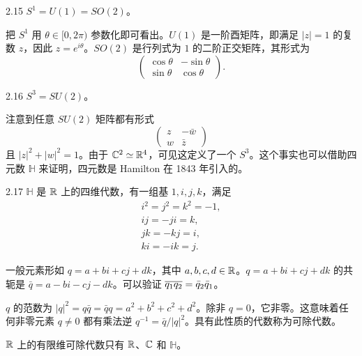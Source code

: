 \begin{proposition}{2.15}
$S^1=U(1)=SO(2)$。
\end{proposition}

把 $S^1$ 用 $\theta\in[0,2\pi)$ 参数化即可看出。$U(1)$ 是一阶酉矩阵，即满足 $|z|=1$ 的复数 $z$，因此 $z=e^{i\theta}$。$SO(2)$ 是行列式为 $1$ 的二阶正交矩阵，其形式为
\begin{equation}
\begin{pmatrix}\cos\theta & -\sin\theta\\ \sin\theta & \cos\theta\end{pmatrix}. \tag{2.16}
\end{equation}

\begin{proposition}{2.16}
$S^3=SU(2)$。
\end{proposition}

注意到任意 $SU(2)$ 矩阵都有形式
\begin{equation}
\begin{pmatrix} z & -\bar w\\ w & \bar z\end{pmatrix} \tag{2.17}
\end{equation}
且 $|z|^2+|w|^2=1$。由于 $\mathbb{C}^2\simeq\mathbb{R}^4$，可见这定义了一个 $S^3$。这个事实也可以借助四元数 $\mathbb{H}$ 来证明，四元数是 Hamilton 在 1843 年引入的。

\begin{definition}{2.17}
$\mathbb{H}$ 是 $\mathbb{R}$ 上的四维代数，有一组基 $1,i,j,k$，满足
\begin{equation}
\begin{gathered}
i^2=j^2=k^2=-1,\\
ij=-ji=k,\\
jk=-kj=i,\\
ki=-ik=j.
\end{gathered}\tag{2.18}
\end{equation}
\end{definition}

一般元素形如 $q=a+bi+cj+dk$，其中 $a,b,c,d\in\mathbb{R}$。$q=a+bi+cj+dk$ 的共轭是 $\bar q=a-bi-cj-dk$。可以验证 $\overline{q_1q_2}=\bar q_2\bar q_1$。

$q$ 的范数为 $|q|^2=q\bar q=\bar q q=a^2+b^2+c^2+d^2$。除非 $q=0$，它非零。这意味着任何非零元素 $q\neq0$ 都有乘法逆 $q^{-1}=\bar q/|q|^2$。具有此性质的代数称为可除代数。

\begin{qmbox}
$\mathbb{R}$ 上的有限维可除代数只有 $\mathbb{R}$、$\mathbb{C}$ 和 $\mathbb{H}$。
\end{qmbox}

